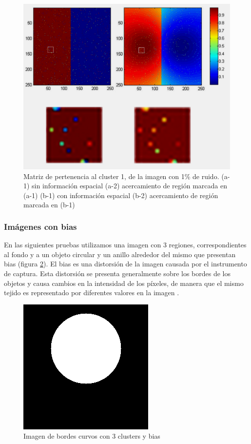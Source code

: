 \begin{figure}[H]
\centering
\includegraphics[scale=0.05]{images/mitad_mitad_ruido_zoom-001.jpg}
\caption{Matriz de pertenencia al cluster 1, de la imagen con 1\% de ruido. 
(a-1) sin información espacial (a-2) acercamiento de región marcada en (a-1)
(b-1) con información espacial (b-2) acercamiento de región marcada en (b-1)}
\label{fig:mitad_mitad_ruido_zoom}
\end{figure}

\subsubsection{Imágenes con bias}
En las siguientes pruebas utilizamos una imagen con 3 regiones, correspondientes al fondo y a un objeto circular y un anillo alrededor del mismo que presentan bias (figura \ref{fig:circulo_bias}). El bias es una distorsión de la imagen causada por el instrumento de captura. Esta distorsión se presenta generalmente sobre los bordes de los objetos y causa cambios en la intensidad de los píxeles, de manera que el mismo tejido es representado por diferentes valores en la imagen \citep{juntu2005bias}.

\begin{figure}[H]
\centering
\includegraphics[scale=0.3]{images/biasing.png}
\caption{Imagen de bordes curvos con 3 clusters y bias}
\label{fig:circulo_bias}
\end{figure}

